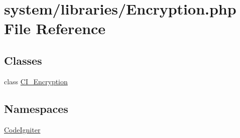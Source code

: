 \hypertarget{_encryption_8php}{}\section{system/libraries/\+Encryption.php File Reference}
\label{_encryption_8php}
\subsection*{Classes}
\begin{DoxyCompactItemize}
\item 
class \mbox{\hyperlink{class_c_i___encryption}{C\+I\+\_\+\+Encryption}}
\end{DoxyCompactItemize}
\subsection*{Namespaces}
\begin{DoxyCompactItemize}
\item 
 \mbox{\hyperlink{namespace_code_igniter}{Code\+Igniter}}
\end{DoxyCompactItemize}
